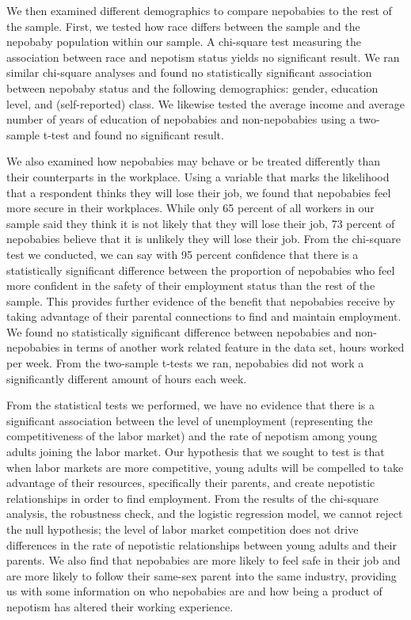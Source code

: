 \documentclass[12pt]{article}
\begin{document}
We then examined different demographics to compare nepobabies to the rest of the sample. First, we tested how race differs between the sample and the nepobaby population within our sample. A chi-square test measuring the association between race and nepotism status yields no significant result. We ran similar chi-square analyses and found no statistically significant association between nepobaby status and the following demographics: gender, education level, and (self-reported) class. We likewise tested the average income and average number of years of education of nepobabies and non-nepobabies using a two-sample t-test and found no significant result.

We also examined how nepobabies may behave or be treated differently than their counterparts in the workplace. Using a variable that marks the likelihood that a respondent thinks they will lose their job, we found that nepobabies feel more secure in their workplaces. While only 65 percent of all workers in our sample said they think it is not likely that they will lose their job, 73 percent of nepobabies believe that it is unlikely they will lose their job. From the chi-square test we conducted, we can say with 95 percent confidence that there is a statistically significant difference between the proportion of nepobabies who feel more confident in the safety of their employment status than the rest of the sample. This provides further evidence of the benefit that nepobabies receive by taking advantage of their parental connections to find and maintain employment. We found no statistically significant difference between nepobabies and non-nepobabies in terms of another work related feature in the data set, hours worked per week. From the two-sample t-tests we ran, nepobabies did not work a significantly different amount of hours each week.

From the statistical tests we performed, we have no evidence that there is a significant association between the level of unemployment (representing the competitiveness of the labor market) and the rate of nepotism among young adults joining the labor market. Our hypothesis that we sought to test is that when labor markets are more competitive, young adults will be compelled to take advantage of their resources, specifically their parents, and create nepotistic relationships in order to find employment. From the results of the chi-square analysis, the robustness check, and the logistic regression model, we cannot reject the null hypothesis; the level of labor market competition does not drive differences in the rate of nepotistic relationships between young adults and their parents. We also find that nepobabies are more likely to feel safe in their job and are more likely to follow their same-sex parent into the same industry, providing us with some information on who nepobabies are and how being a product of nepotism has altered their working experience.
\end{document}
